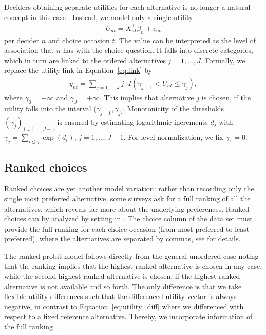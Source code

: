 \documentclass[article,shortnames]{jss}
\newcommand{\fct}[1]{\code{#1()}}
\begin{document}
Deciders obtaining separate utilities for each alternative is no longer a natural concept in this case \citep[Ch.\ 7.4]{Train:2009}. Instead, we model only a single utility
%
\begin{align*}
  U_{nt} = X_{nt}^\top \beta_n + \epsilon_{nt}
\end{align*}
%
per decider $n$ and choice occasion $t$. The value can be interpreted as the level of association that $n$ has with the choice question. It falls into discrete categories, which in turn are linked to the ordered alternatives $j=1,\dots,J$. Formally, we replace the utility link in Equation~\ref{eq:link} by
%
\begin{align*}
   y_{nt} = \sum_{j = 1,\dots,J} j \cdot I(\gamma_{j-1} < U_{nt} \leq \gamma_{j}),
\end{align*}
%
where $\gamma_0 = -\infty$ and $\gamma_J = +\infty$. This implies that alternative $j$ is chosen, if the utility falls into the interval $(\gamma_{j-1}, \gamma_j]$. Monotonicity of the thresholds $(\gamma_j)_{j=1,\dots,J-1}$ is ensured by estimating logarithmic increments $d_j$ with $\gamma_j = \sum_{i\leq j} \exp{(d_i)}$, $j=1,\dots,J-1$. For level normalization, we fix $\gamma_1 = 0$.

\subsection{Ranked choices} \label{subsec:ranked_choices}

Ranked choices are yet another model variation: rather than recording only the single most preferred alternative, some surveys ask for a full ranking of all the alternatives, which reveals far more about the underlying preferences. Ranked choices can by analyzed by setting  in \fct{prepare\_data}. The choice column of the data set must provide the full ranking for each choice occasion (from most preferred to least preferred), where the alternatives are separated by commas, see  for details.

The ranked probit model follows directly from the general unordered case noting that the ranking implies that the highest ranked alternative is chosen in any case, while the second highest ranked alternative is chosen, if the highest ranked alternative is not available and so forth. The only difference is that we take flexible utility differences such that the differenced utility vector is always negative, in contrast to Equation~\ref{eq:utility_diff} where we differenced with respect to a fixed reference alternative. Thereby, we incorporate information of the full ranking \citep[Ch.\ 7.3]{Train:2009}.
\end{document}
